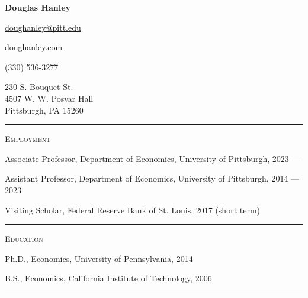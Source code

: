 \documentclass{article}
\begin{document}
\thispagestyle{empty}

\begin{center}
{\LARGE \textbf{Douglas Hanley}}
\end{center}

\begin{center}
\parbox{2.0in}{
\begin{flushright}
\href{mailto:doughanley@pitt.edu}{doughanley@pitt.edu} 

\href{http://doughanley.com/}{doughanley.com} 

(330) 536-3277
\end{flushright}
}
\hspace{0.5cm}
\parbox{2.0in}{
230 S. Bouquet St. \\
4507 W. W. Posvar Hall \\
Pittsburgh, PA 15260
}
\end{center}

\hspace{-0.025\textwidth}\rule{1.05\textwidth}{0.1mm}

\vspace{0.3cm}


\parbox{\textwidth}{
\parbox[t]{0.28\textwidth}{ \raggedright \noindent \textsc{ Employment } }
\parbox[t]{0.72\textwidth}{ \raggedright

Associate Professor, Department of Economics, University of Pittsburgh, 2023 —
\vspace{0.27cm}

Assistant Professor, Department of Economics, University of Pittsburgh, 2014 — 2023
\vspace{0.27cm}

Visiting Scholar, Federal Reserve Bank of St. Louis, 2017 (short term)
\vspace{0.27cm}

}
\textcolor{light-gray}{\hrule}
}
\vspace{0.3cm}

\parbox{\textwidth}{
\parbox[t]{0.28\textwidth}{ \raggedright \noindent \textsc{ Education } }
\parbox[t]{0.72\textwidth}{ \raggedright

Ph.D., Economics, University of Pennsylvania, 2014
\vspace{0.27cm}

B.S., Economics, California Institute of Technology, 2006
\vspace{0.27cm}

}
\textcolor{light-gray}{\hrule}
}
\vspace{0.3cm}
\end{document}
